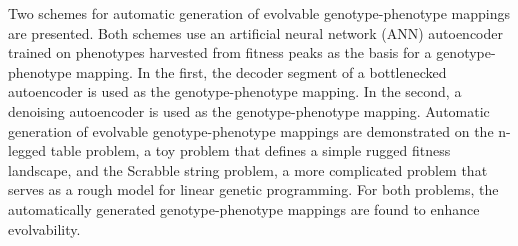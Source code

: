 Two schemes for automatic generation of evolvable genotype-phenotype mappings are presented. Both schemes use an artificial neural network (ANN) autoencoder trained on phenotypes harvested from fitness peaks as the basis for a genotype-phenotype mapping. In the first, the decoder segment of a bottlenecked autoencoder is used as the genotype-phenotype mapping. In the second, a denoising autoencoder is used as the genotype-phenotype mapping. Automatic generation of evolvable genotype-phenotype mappings are demonstrated on the n-legged table problem, a toy problem that defines a simple rugged fitness landscape, and the Scrabble string problem, a more complicated problem that serves as a rough model for linear genetic programming. For both problems, the automatically generated genotype-phenotype mappings are found to enhance evolvability.
